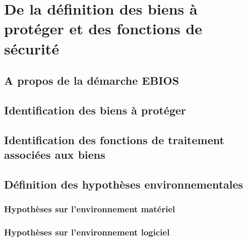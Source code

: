 

\chapter{De la définition des biens à protéger et des fonctions de sécurité}
\doMinitoc

\section{A propos de la démarche EBIOS}

\section{Identification des biens à protéger}

\section{Identification des fonctions de traitement associées aux biens}

\section{Définition des hypothèses environnementales}

\subsection{Hypothèses sur l'environnement matériel}

\subsection{Hypothèses sur l'environnement logiciel}

